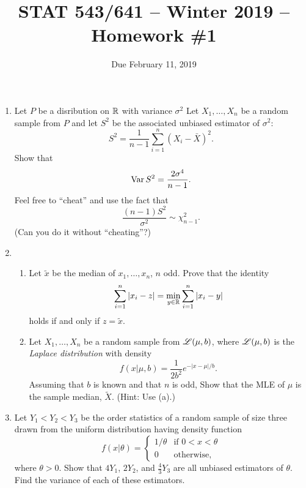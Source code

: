 \documentclass[12pt]{amsart}
\begin{document}
    \title{STAT 543/641 -- Winter 2019 -- Homework \#1}

    \author{Due February 11, 2019}
    \maketitle

    \begin{enumerate}
        \setlength\itemsep{1em}
        \item Let $P$ be a disribution on $\mathbb{R}$ with variance $\sigma^2$
        Let $X_1,\ldots,X_n$ be a random sample from $P$ and let $S^2$ be
        the associated unbiased estimator of $\sigma^2$:
        \[
            S^2 = \frac1{n-1}\sum_{i=1}^n (X_i-\bar X)^2.
        \]
        Show that
        \[\operatorname{Var} S^2 = \dfrac{2\sigma^4}{n-1}.\]
        Feel free to ``cheat'' and use the fact that
        \[\frac{(n-1)S^2}{\sigma^2}\sim\chi^2_{n-1}.\]
        (Can you do it without ``cheating''?)

        \item 
        \begin{enumerate}
            \setlength{\itemsep}{0.5em}
            \item Let $\tilde{x}$ be the median of $x_1,\ldots,x_n$, $n$ odd. Prove that the identity
            \[\sum_{i=1}^n|x_i-z| = \min_{y\in\mathbb{R}} \sum_{i=1}^n|x_i-y|\]
            holds if and only if $z=\tilde x$.
            \item Let $X_1,\ldots,X_n$ be a random sample from $\mathscr{L}(\mu, b)$, where $\mathscr{L}(\mu, b)$
            is the \emph{Laplace distribution} with density
            \[f(x|\mu, b) = \frac1{2b^2}e^{-|x-\mu|/b}.\]
            Assuming that $b$ is known and that $n$ is odd, Show that the MLE of $\mu$
            is the sample median, $\tilde{X}$. (Hint: Use (a).)
        \end{enumerate}

        \item \cite[Exercise 7.1.3]{HMC} Let $Y_1< Y_2< Y_3$ be the order statistics of
        a random sample of size three drawn from the uniform distribution having density function
    \[f(x|\theta)=\begin{cases}
    1/\theta&\text{if $0<x<\theta$}\\
     0&\text{otherwise,}
    \end{cases}\]
    where $\theta>0$. Show that $4Y_1$, $2Y_2$, and $\frac43Y_3$ are all unbiased estimators of $\theta$.
    Find the variance of each of these estimators.


\end{enumerate}
\end{document}
